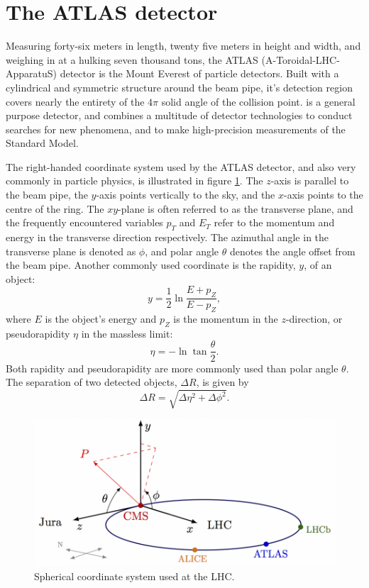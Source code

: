 \section{The ATLAS detector}\label{sec:ATLAS}

Measuring forty-six meters in length, twenty five meters in height and width, and weighing in at a hulking seven thousand tons, the ATLAS (A-Toroidal-LHC-ApparatuS) detector is the Mount Everest of particle detectors. Built with a cylindrical and symmetric structure around the beam pipe, it's detection region covers nearly the entirety of the $4\pi$ solid angle of the collision point. \ATLAS is a general purpose detector, and combines a multitude of detector technologies to conduct searches for new phenomena, and to make high-precision measurements of the Standard Model.

The right-handed coordinate system used by the ATLAS detector, and also very commonly in particle physics, is illustrated in figure \ref{fig:atlascoordinate}. The $z$-axis is parallel to the beam pipe, the $y$-axis points vertically to the sky, and the $x$-axis points to the centre of the \LHC ring. The $xy$-plane is often referred to as the transverse plane, and the frequently encountered variables $p_T$ and $E_T$ refer to the momentum and energy in the transverse direction respectively. The azimuthal angle in the transverse plane is denoted as $\phi$, and polar angle $\theta$ denotes the angle offset from the beam pipe. Another commonly used coordinate is the rapidity, $y$, of an object:
\begin{equation}
    y=\dfrac{1}{2}\ln\dfrac{E+p_Z}{E-p_Z},
\end{equation}
where $E$ is the object's energy and $p_Z$ is the momentum in the $z$-direction, or pseudorapidity $\eta$ in the massless limit:
\begin{equation}
    \eta=-\ln\tan \dfrac{\theta}{2}.
\end{equation}
Both rapidity and pseudorapidity are more commonly used than polar angle $\theta$. The separation of two detected objects, $\Delta R$, is given by
\begin{equation}
    \Delta R=\sqrt{\Delta\eta^2+\Delta\phi^2}.
\end{equation}

\begin{figure}
    \centering
    \includegraphics[width=\smallfigwidth]{Figures/LHC/cms_coordinate_system.png}
    \caption{Spherical coordinate system used at the LHC.}
    \label{fig:atlascoordinate}
\end{figure}

